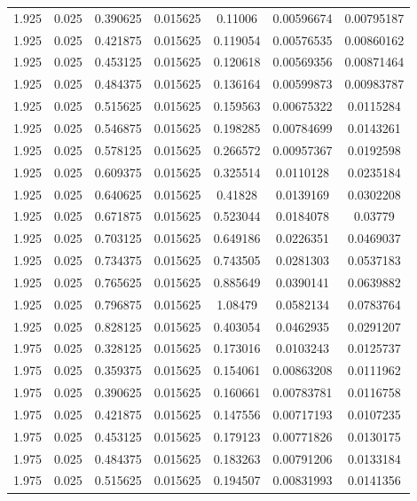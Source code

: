 \begin{table}[bh]
\begin{center}
{\begin{tabular}{ccccccc}
1.925	 & 0.025 & 	0.390625	 & 0.015625	 & 0.11006	 & 0.00596674	 & 0.00795187 \\ 
1.925	 & 0.025 & 	0.421875	 & 0.015625	 & 0.119054	 & 0.00576535	 & 0.00860162 \\ 
1.925	 & 0.025 & 	0.453125	 & 0.015625	 & 0.120618	 & 0.00569356	 & 0.00871464 \\ 
1.925	 & 0.025 & 	0.484375	 & 0.015625	 & 0.136164	 & 0.00599873	 & 0.00983787 \\ 
1.925	 & 0.025 & 	0.515625	 & 0.015625	 & 0.159563	 & 0.00675322	 & 0.0115284 \\ 
1.925	 & 0.025 & 	0.546875	 & 0.015625	 & 0.198285	 & 0.00784699	 & 0.0143261 \\ 
1.925	 & 0.025 & 	0.578125	 & 0.015625	 & 0.266572	 & 0.00957367	 & 0.0192598 \\ 
1.925	 & 0.025 & 	0.609375	 & 0.015625	 & 0.325514	 & 0.0110128	 & 0.0235184 \\ 
1.925	 & 0.025 & 	0.640625	 & 0.015625	 & 0.41828	 & 0.0139169	 & 0.0302208 \\ 
1.925	 & 0.025 & 	0.671875	 & 0.015625	 & 0.523044	 & 0.0184078	 & 0.03779 \\ 
1.925	 & 0.025 & 	0.703125	 & 0.015625	 & 0.649186	 & 0.0226351	 & 0.0469037 \\ 
1.925	 & 0.025 & 	0.734375	 & 0.015625	 & 0.743505	 & 0.0281303	 & 0.0537183 \\ 
1.925	 & 0.025 & 	0.765625	 & 0.015625	 & 0.885649	 & 0.0390141	 & 0.0639882 \\ 
1.925	 & 0.025 & 	0.796875	 & 0.015625	 & 1.08479	 & 0.0582134	 & 0.0783764 \\ 
1.925	 & 0.025 & 	0.828125	 & 0.015625	 & 0.403054	 & 0.0462935	 & 0.0291207 \\ 
1.975	 & 0.025 & 	0.328125	 & 0.015625	 & 0.173016	 & 0.0103243	 & 0.0125737 \\ 
1.975	 & 0.025 & 	0.359375	 & 0.015625	 & 0.154061	 & 0.00863208	 & 0.0111962 \\ 
1.975	 & 0.025 & 	0.390625	 & 0.015625	 & 0.160661	 & 0.00783781	 & 0.0116758 \\ 
1.975	 & 0.025 & 	0.421875	 & 0.015625	 & 0.147556	 & 0.00717193	 & 0.0107235 \\ 
1.975	 & 0.025 & 	0.453125	 & 0.015625	 & 0.179123	 & 0.00771826	 & 0.0130175 \\ 
1.975	 & 0.025 & 	0.484375	 & 0.015625	 & 0.183263	 & 0.00791206	 & 0.0133184 \\ 
1.975	 & 0.025 & 	0.515625	 & 0.015625	 & 0.194507	 & 0.00831993	 & 0.0141356 \\ 

\end{tabular}}
\end{center}
\end{table}
